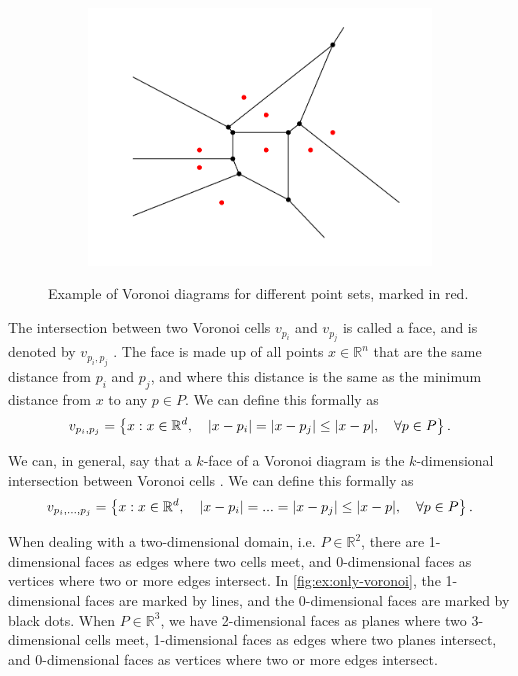 \begin{figure}[ht]
\begin{subfigure}[b]{0.3\textwidth}
        \includegraphics[width=\textwidth]{report/Images/Theory/voronoi/voronoi_example3.png}
    \end{subfigure}
    \caption[Example of Voronoi diagrams]{Example of Voronoi diagrams for different point sets, marked in red.}
    \label{fig:ex:only-voronoi}
\end{figure}

The intersection between two Voronoi cells $v_{p_i}$ and $v_{p_j}$ is called a face, and is denoted by $v_{p_i, p_j}$ \cite{UPR_chapter}. The face is made up of all points $x \in \mathbb{R}^n$ that are the same distance from $p_i$ and $p_j$, and where this distance is the same as the minimum distance from $x$ to any $p \in P$. We can define this formally as
\begin{equation}
\label{eq:voronoi-face}
    v_{p_i, p_j} = \left\{ x : x \in \mathbb{R}^d,\quad \lvert x - p_i\rvert = \lvert x - p_j\rvert \leq \lvert x - p\rvert,\quad \forall p \in P \right\}.
\end{equation}

We can, in general, say that a $k$-face of a Voronoi diagram is the $k$-dimensional intersection between Voronoi cells \cite{UPR_chapter}. We can define this formally as
\begin{equation}
\label{eq:voronoi-k-faces}
    v_{p_i,..., p_j} = \left\{ x : x \in \mathbb{R}^d,\quad \lvert x - p_i\rvert = ... = \lvert x - p_j\rvert \leq \lvert x - p\rvert,\quad \forall p \in P \right\}.
\end{equation}

When dealing with a two-dimensional domain, i.e. $P \in \mathbb{R}^2$, there are 1-dimensional faces as edges where two cells meet, and 0-dimensional faces as vertices where two or more edges intersect. In \autoref{fig:ex:only-voronoi}, the 1-dimensional faces are marked by lines, and the 0-dimensional faces are marked by black dots. When $P \in \mathbb{R}^3$, we have 2-dimensional faces as planes where two 3-dimensional cells meet, 1-dimensional faces as edges where two planes intersect, and 0-dimensional faces as vertices where two or more edges intersect.

